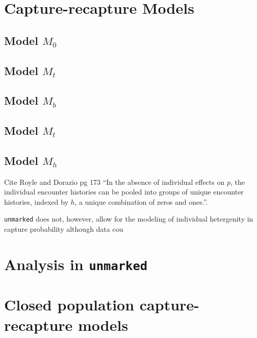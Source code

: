 \documentclass[a4paper]{article}
\begin{document}
\section{Capture-recapture Models}



\subsection{Model $M_0$}



\subsection{Model $M_t$}





\subsection{Model $M_b$}




\subsection{Model $M_t$}


\subsection{Model $M_h$}

Cite Royle and Dorazio pg 173 ``In the absence of individual effects
on $p$, the individual encounter histories can be pooled into groups
of unique encounter histories, indexed by $h$, a unique combination of
zeros and ones.''.

{\tt unmarked} does not, however, allow for the modeling of individual
  hetergenity in capture probability although data cou


\section{Analysis in {\tt unmarked}}




\section{Closed population capture-recapture models}
\end{document}
